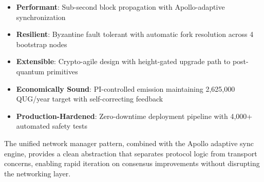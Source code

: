 \documentclass[11pt,a4paper]{article}
\begin{document}
\begin{itemize}
    \item \textbf{Performant}: Sub-second block propagation with Apollo-adaptive synchronization
    \item \textbf{Resilient}: Byzantine fault tolerant with automatic fork resolution across 4 bootstrap nodes
    \item \textbf{Extensible}: Crypto-agile design with height-gated upgrade path to post-quantum primitives
    \item \textbf{Economically Sound}: PI-controlled emission maintaining 2,625,000 QUG/year target with self-correcting feedback
    \item \textbf{Production-Hardened}: Zero-downtime deployment pipeline with 4,000+ automated safety tests
\end{itemize}

The unified network manager pattern, combined with the Apollo adaptive sync engine, provides a clean abstraction that separates protocol logic from transport concerns, enabling rapid iteration on consensus improvements without disrupting the networking layer.

\end{document}
